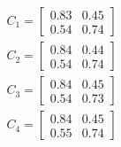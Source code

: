 \documentclass{article}
\begin{document}
  \begin{align}
    C_1=
    \begin{bmatrix}
      0.83 & 0.45 \\
      0.54 & 0.74
    \end{bmatrix}
    \\
    C_2=
    \begin{bmatrix}
      0.84 & 0.44 \\
      0.54 & 0.74
    \end{bmatrix}
    \\
    C_3=
    \begin{bmatrix}
      0.84 & 0.45 \\
      0.54 & 0.73
    \end{bmatrix}
    \\
    C_4=
    \begin{bmatrix}
      0.84 & 0.45 \\
      0.55 & 0.74
    \end{bmatrix}
    \end{align}
\end{document}
